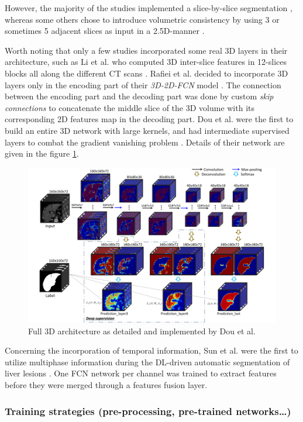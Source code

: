 \documentclass[]{article}
\begin{document}
	However, the majority of the studies implemented a slice-by-slice
	segmentation \cite{Chlebus2018, Kaluva2018, Bi2017}, whereas some others chose to introduce volumetric
	consistency by using 3 or sometimes 5 adjacent slices as input in a
	2.5D-manner \cite{Han2017, Yuan2017, Bellver2017}.
	
	
	Worth noting that only a few studies incorporated some real 3D layers in
	their architecture, such as Li et al. who computed 3D
	inter-slice features in 12-slices blocks all along the different CT
	scans \cite{Li2018}. Rafiei et al. decided to incorporate 3D layers only in
	the encoding part of their \emph{3D-2D-FCN} model \cite{Rafiei2018}. The connection
	between the encoding part and the decoding part was done by custom
	\emph{skip connections} to concatenate the middle slice of the 3D volume
	with its corresponding 2D features map in the decoding part. Dou
	et al. were the first to build an entire 3D network with large kernels,
	and had intermediate supervised layers to combat the gradient vanishing
	problem \cite{Dou2016}. Details of their network are given in the figure \ref{Dou2016_3Darchitecture}.
	
	\begin{figure}[th!]
		\centering
		\includegraphics[width=0.7\linewidth]{images/image30}
		\caption{Full 3D architecture as detailed and implemented by Dou et al. \cite{Dou2016}}
		\label{Dou2016_3Darchitecture}
	\end{figure}
	
	Concerning the incorporation of temporal information, Sun et
	al. were the first to utilize multiphase information during the
	DL-driven automatic segmentation of liver lesions \cite{Sun2017}. One FCN network per
	channel was trained to extract features before they were merged through
	a features fusion layer.
	
	\subsubsection*{Training strategies (pre-processing, pre-trained networks\ldots{})}
	
\end{document}
